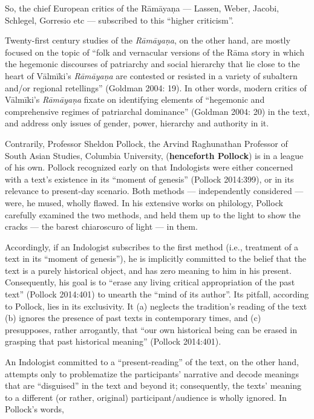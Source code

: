 So, the chief European critics of the Rāmāyaṇa — Lassen, Weber, Jacobi, Schlegel, Gorresio etc --- subscribed to this “higher criticism”. 

Twenty-first century studies of the {\sl Rāmāyaṇa}, on the other hand, are mostly focused on the topic of “folk and vernacular versions of the Rāma story in which the hegemonic discourses of patriarchy and social hierarchy that lie close to the heart of Vālmīki’s {\sl Rāmāyaṇa} are contested or resisted in a variety of subaltern and/or regional retellings” (Goldman 2004: 19). In other words, modern critics of Vālmīki’s {\sl Rāmāyaṇa} fixate on identifying elements of “hegemonic and comprehensive regimes of patriarchal dominance” (Goldman 2004: 20) in the text, and address only issues of gender, power, hierarchy and authority in it.  

Contrarily, Professor Sheldon Pollock, the Arvind Raghunathan Professor of South Asian Studies, Columbia University, ({\bf henceforth Pollock}) is in a league of his own. Pollock recognized early on that Indologists were either concerned with a text’s existence in its “moment of genesis” (Pollock 2014:399), or in its relevance to present-day scenario. Both methods --- independently considered --- were, he mused, wholly flawed. In his extensive works on philology, Pollock carefully examined the two methods, and held them up to the light to show the cracks --- the barest chiaroscuro of light --- in them.

Accordingly, if an Indologist subscribes to the first method (i.e., treatment of a text in its “moment of genesis”), he is implicitly committed to the belief that the text is a purely historical object, and has zero meaning to him in his present. Consequently, his goal is to “erase any living critical appropriation of the past text” (Pollock 2014:401) to unearth the “mind of its author”. Its pitfall, according to Pollock, lies in its exclusivity. It (a) neglects the tradition’s reading of the text (b) ignores the presence of past texts in contemporary times, and (c) presupposes, rather arrogantly, that “our own historical being can be erased in grasping that past historical meaning” (Pollock 2014:401). 

\newpage

An Indologist committed to a “present-reading” of the text, on the other hand, attempts only to problematize the participants’ narrative and decode meanings that are “disguised” in the text and beyond it; consequently, the texts’ meaning to a different (or rather, original) participant/audience is wholly ignored. In Pollock’s words, 

